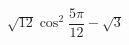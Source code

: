 \begin{ex}[type=type=expression]
	\begin{condition}
		\( \sqrt{12}\cos^2\dfrac{5\pi}{12}-\sqrt{3} \)
	\end{condition}
\end{ex}